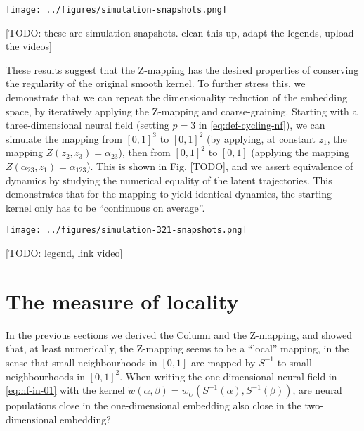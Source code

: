 \documentclass[10pt,letterpaper]{article}
\begin{document}
\texttt{[image: ../figures/simulation-snapshots.png]}

[TODO: these are simulation snapshots. clean this up, adapt the legends, upload the videos]
\endif

These results suggest that the Z-mapping has the desired properties of conserving the regularity of the original smooth kernel. To further stress this, we demonstrate that we can repeat the dimensionality reduction of the embedding space, by iteratively applying the Z-mapping and coarse-graining. Starting with a three-dimensional neural field (setting $p=3$ in \autoref{eq:def-cycling-nf}), we can simulate the mapping from $[0,1]^3$ to $[0,1]^2$ (by applying, at constant $z_1$, the mapping $Z(z_2,z_3) = \alpha_{23}$), then from $[0,1]^2$ to $[0,1]$ (applying the mapping $Z(\alpha_{23},z_1)=\alpha_{123}$). This is shown in Fig. [TODO], and we assert equivalence of dynamics by studying the numerical equality of the latent trajectories. This demonstrates that for the mapping to yield identical dynamics, the starting kernel only has to be ``continuous on average''.

\texttt{[image: ../figures/simulation-321-snapshots.png]}

[TODO: legend, link video]
\endif

\section{The measure of locality}

In the previous sections we derived the Column and the Z-mapping, and showed that, at least numerically, the Z-mapping seems to be a ``local'' mapping, in the sense that small neighbourhoods in $[0,1]$ are mapped by $S^{-1}$ to small neighbourhoods in $[0,1]^2$. When writing the one-dimensional neural field in \autoref{eq:nf-in-01} with the kernel $\tilde w(\alpha,\beta) = w_U(S^{-1}(\alpha), S^{-1}(\beta))$, are neural populations close in the one-dimensional embedding also close in the two-dimensional embedding?

\end{document}
